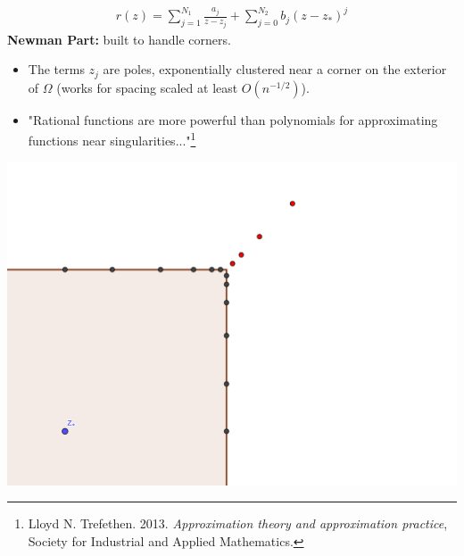 \documentclass{seminar}
\begin{document}
\begin{slide} %
{} \small \\
\begin{align*}
r(z)= \sum_{j=1}^{N_1} \frac{a_j}{z-z_j} + \sum_{j=0}^{N_2} b_j (z-z_*)^j
\end{align*}
\textbf{Newman Part:} built to handle corners.

\begin{multicols}{2}
\begin{itemize}
	\item The terms $z_j$ are poles, exponentially clustered near a corner on the exterior of $\Omega$ (works for spacing scaled at least $O(n^{-1/2})$).
	\item "Rational functions are more powerful than polynomials for approximating functions near singularities..."\footnote{Lloyd N. Trefethen. 2013. \emph{Approximation theory and approximation practice}, Society for Industrial and Applied Mathematics.}
\end{itemize}
\includegraphics[scale=4]{./PNG/corner_nodes_illust}
\end{multicols}
\end{slide} %
\end{document}
